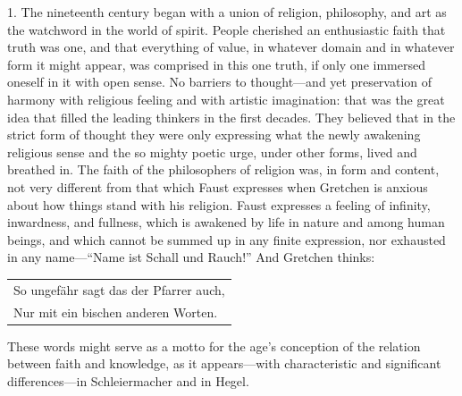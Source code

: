 \documentclass[12pt,a4paper]{book}
\newcommand{\opage}[1]{\marginnote{\footnotesize\textit{[#1]}}}
\begin{document}
1. The nineteenth century began with a union of religion, philosophy,
and art as the watchword in the world of spirit. People cherished an
enthusiastic faith that truth was one, and that everything of value, in
whatever domain and in whatever form it might appear, was comprised in
this one truth, if only one immersed oneself in it with open sense. No
barriers to thought---and yet preservation of harmony with religious
feeling and with artistic imagination: that was the great idea that
filled the leading thinkers in the first decades. They believed that in
the strict form of thought they were only expressing what the newly
awakening religious sense and the so mighty poetic urge, under other
forms, lived and breathed in. The faith of the philosophers of religion
was, in form and content, not very different from that which Faust
expresses when Gretchen is anxious about how things stand with his
religion. Faust expresses a feeling of infinity, inwardness, and
fullness, which is awakened by life in nature and among human beings,
and which cannot be summed up in any finite expression, nor exhausted
in any name---``Name ist Schall und Rauch!'' And Gretchen thinks:

\opage{6}\begin{center}\small\begin{tabular}{@{}l@{}}
So ungefähr sagt das der Pfarrer auch,\\
Nur mit ein bischen anderen Worten.
\end{tabular}\end{center}

These words might serve as a motto for the age's conception of
the relation between faith and knowledge, as it appears---with
characteristic and significant differences---in Schleiermacher and in
Hegel.
\end{document}
